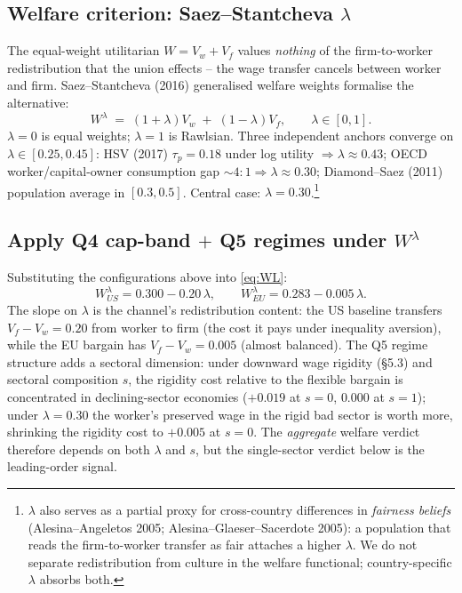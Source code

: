 \documentclass[9pt,a4paper]{extarticle}
\begin{document}
\subsection{Welfare criterion: Saez--Stantcheva $\lambda$}
The equal-weight utilitarian $W\!=\!V_w+V_f$ values \emph{nothing}
of the firm-to-worker redistribution that the union effects -- the
wage transfer cancels between worker and firm. Saez--Stantcheva
(2016) generalised welfare weights formalise the alternative:
\begin{equation}
\boxed{\;W^{\lambda}\;=\;(1+\lambda)V_w\;+\;(1-\lambda)V_f,\qquad
\lambda\in[0,1].\;}
\label{eq:WL}
\end{equation}
$\lambda\!=\!0$ is equal weights; $\lambda\!=\!1$ is Rawlsian.
Three independent anchors converge on $\lambda\!\in\![0.25,0.45]$:
HSV (2017) $\tau_p\!=\!0.18$ under log utility
$\Rightarrow\lambda\!\approx\!0.43$; OECD worker/capital-owner
consumption gap $\sim\!4{:}1\Rightarrow\lambda\!\approx\!0.30$;
Diamond--Saez (2011) population average in $[0.3,0.5]$. Central
case: $\lambda\!=\!0.30$.\footnote{\label{fn:lambda-culture}$\lambda$
also serves as a partial proxy for cross-country differences in
\emph{fairness beliefs} (Alesina--Angeletos 2005;
Alesina--Glaeser--Sacerdote 2005): a population that reads the
firm-to-worker transfer as fair attaches a higher $\lambda$. We do
not separate redistribution from culture in the welfare functional;
country-specific $\lambda$ absorbs both.}

\subsection{Apply Q4 cap-band $+$ Q5 regimes under $W^{\lambda}$}
Substituting the configurations above into \eqref{eq:WL}:
\[
W^{\lambda}_{US}=0.300-0.20\,\lambda,\qquad
W^{\lambda}_{EU}=0.283-0.005\,\lambda.
\]
The slope on $\lambda$ is the channel's redistribution content: the
US baseline transfers $V_f-V_w\!=\!0.20$ from worker to firm (the
cost it pays under inequality aversion), while the EU bargain has
$V_f-V_w\!=\!0.005$ (almost balanced). The Q5 regime structure
adds a sectoral dimension: under downward wage rigidity (\S 5.3) and
sectoral composition $s$, the rigidity cost relative to the flexible
bargain is concentrated in declining-sector economies ($+0.019$ at
$s\!=\!0$, $0.000$ at $s\!=\!1$); under $\lambda\!=\!0.30$ the
worker's preserved wage in the rigid bad sector is worth more,
shrinking the rigidity cost to $+0.005$ at $s\!=\!0$. The
\emph{aggregate} welfare verdict therefore depends on both $\lambda$
and $s$, but the single-sector verdict below is the leading-order
signal.
\end{document}
